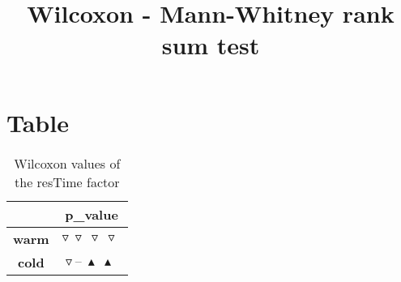 \documentclass{article}
\title{Wilcoxon - Mann-Whitney rank sum test}
\author{}
\begin{document}
\maketitle
\section{Table}
\begin{table}[!htp]
  \caption{Wilcoxon values of the resTime factor}
  \label{table:resTime}
  \centering
  \begin{scriptsize}
  \begin{tabular}{c|c}
      & \textbf{p\_value} \\\hline
      \textbf{warm} & $\triangledown\ \triangledown\ \triangledown\ \triangledown\ $ \\
      \textbf{cold} & $\triangledown\ \text{--}\ \blacktriangle\ \blacktriangle\ $ \\
  \end{tabular}
  \end{scriptsize}
\end{table}
\end{document}
